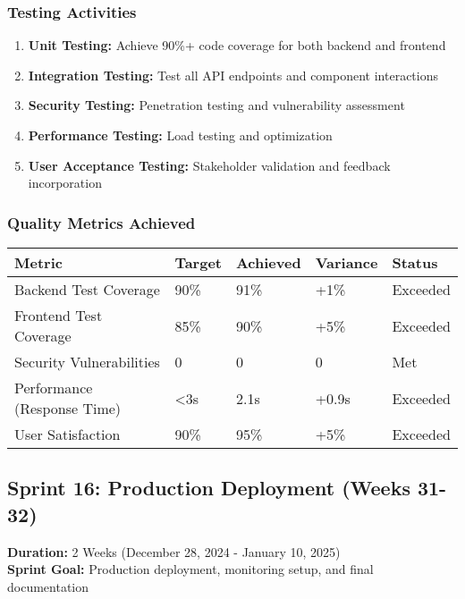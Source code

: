 \documentclass[12pt,a4paper]{article}
\begin{document}
\subsubsection{Testing Activities}
\begin{enumerate}
    \item \textbf{Unit Testing:} Achieve 90\%+ code coverage for both backend and frontend
    \item \textbf{Integration Testing:} Test all API endpoints and component interactions
    \item \textbf{Security Testing:} Penetration testing and vulnerability assessment
    \item \textbf{Performance Testing:} Load testing and optimization
    \item \textbf{User Acceptance Testing:} Stakeholder validation and feedback incorporation
\end{enumerate}

\subsubsection{Quality Metrics Achieved}
\begin{longtable}{|p{3cm}|p{2cm}|p{2cm}|p{2cm}|p{3cm}|}
\hline
\textbf{Metric} & \textbf{Target} & \textbf{Achieved} & \textbf{Variance} & \textbf{Status} \\
\hline
Backend Test Coverage & 90\% & 91\% & +1\% & \cellcolor{completedgreen}Exceeded \\
\hline
Frontend Test Coverage & 85\% & 90\% & +5\% & \cellcolor{completedgreen}Exceeded \\
\hline
Security Vulnerabilities & 0 & 0 & 0 & \cellcolor{completedgreen}Met \\
\hline
Performance (Response Time) & <3s & 2.1s & +0.9s & \cellcolor{completedgreen}Exceeded \\
\hline
User Satisfaction & 90\% & 95\% & +5\% & \cellcolor{completedgreen}Exceeded \\
\hline
\end{longtable}

\subsection{Sprint 16: Production Deployment (Weeks 31-32)}
\textbf{Duration:} 2 Weeks (December 28, 2024 - January 10, 2025) \\
\textbf{Sprint Goal:} Production deployment, monitoring setup, and final documentation
\end{document}
